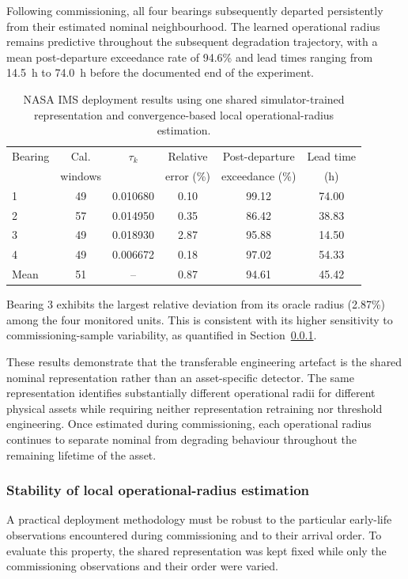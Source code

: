 \documentclass[numbered]{trbunofficial}
\begin{document}
Following commissioning, all four bearings subsequently departed persistently from their estimated nominal neighbourhood.
The learned operational radius remains predictive throughout the subsequent degradation trajectory, with a mean
post-departure exceedance rate of 94.6\% and lead times ranging from
14.5~h to 74.0~h before the documented end of the experiment.

\begin{table}[!ht]
\centering
\caption{NASA IMS deployment results using one shared simulator-trained
representation and convergence-based local operational-radius estimation.}
\label{tab:nasa-main-results}

\begin{tabular}{@{}lccccc@{}}
\toprule
Bearing & Cal.    & $\tau_k$ & Relative   & Post-departure & Lead time \\
        & windows &          & error (\%) & exceedance (\%) & (h)       \\
\midrule
1 & 49 & 0.010680 & 0.10 & 99.12 & 74.00 \\
2 & 57 & 0.014950 & 0.35 & 86.42 & 38.83 \\
3 & 49 & 0.018930 & 2.87 & 95.88 & 14.50 \\
4 & 49 & 0.006672 & 0.18 & 97.02 & 54.33 \\
\midrule
Mean & 51 & -- & 0.87 & 94.61 & 45.42 \\
\bottomrule
\end{tabular}
\end{table}
Bearing 3 exhibits the largest relative deviation from its oracle radius
(2.87\%) among the four monitored units. This is consistent with its
higher sensitivity to commissioning-sample variability, as quantified in
Section~\ref{sec:nasa-stability-sec}.

These results demonstrate that the transferable engineering artefact is the shared nominal representation rather than an asset-specific detector.
The same representation identifies substantially different operational radii for different physical assets while requiring neither representation retraining nor threshold engineering.
Once estimated during commissioning, each operational radius continues to separate nominal from degrading behaviour throughout the remaining lifetime of the asset.

\subsubsection{Stability of local operational-radius estimation}
\label{sec:nasa-stability-sec}
A practical deployment methodology must be robust to the particular
early-life observations encountered during commissioning and to their
arrival order. To evaluate this property, the shared representation was kept
fixed while only the commissioning observations and their order were varied.
\end{document}
